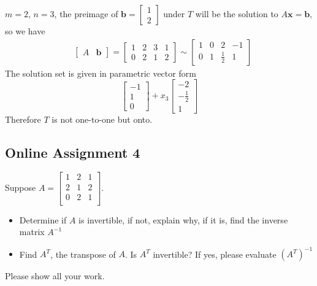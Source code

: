 \documentclass[a4paper,10pt]{article}
\begin{document}
\begin{solution}
$m=2$, $n=3$, the preimage of $\mathbf b=\begin{bmatrix}
1\\2
\end{bmatrix}$ under $T$ will be the solution to $A\mathbf x=\mathbf b$, so we have
\begin{align*}
&\begin{bmatrix}
A&\mathbf b
\end{bmatrix}=\begin{bmatrix}
1&2&3&1\\
0&2&1&2
\end{bmatrix}\sim\begin{bmatrix}
1&0&2&-1\\
0&1&\frac{1}{2}&1
\end{bmatrix}
\end{align*}
The solution set is given in parametric vector form
\[
\begin{bmatrix}
-1\\1\\0
\end{bmatrix}+x_3\begin{bmatrix}
-2\\-\frac{1}{2}\\1
\end{bmatrix}
\]
Therefore $T$ is not one-to-one but onto.
\end{solution}

\subsection{Online Assignment 4}

\begin{problem}
Suppose $A=\begin{bmatrix}
1&2&1\\
2&1&2\\
0&2&1\\
\end{bmatrix}$.
\begin{itemize}
\item Determine if $A$ is invertible, if not, explain why, if it is, find the inverse matrix $A^{-1}$
\item Find $A^T$, the transpose of $A$. Is $A^T$ invertible? If yes, please evaluate $(A^T)^{-1}$
\end{itemize}

Please show all your work.
\end{problem}
\end{document}
